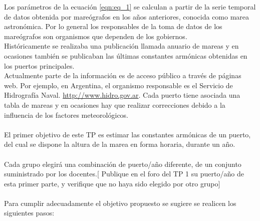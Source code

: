\documentclass[10pt,a4paper]{article}
\numberwithin{equation}{section}
\numberwithin{figure}{section}
\numberwithin{table}{section}
\begin{document}
Los parámetros de la ecuación \ref*{eqn:eq_1} se calculan a partir de la serie temporal de datos obtenida por mareógrafos en los años anteriores, conocida como marea astronómica. Por lo general los responsables de la toma de datos de los mareógrafos son organismos que dependen de los gobiernos.\\
Históricamente se realizaba una publicación llamada anuario de mareas y en ocasiones también se publicaban las últimas constantes armónicas obtenidas en los puertos principales.\\
Actualmente parte de la información es de acceso público a través de páginas web. Por ejemplo, en Argentina, el organismo responsable es el Servicio de Hidrografía Naval. \url{http://www.hidro.gov.ar}. Cada puerto tiene asociada una tabla de mareas y en ocasiones hay que realizar correcciones debido a la influencia de los factores meteorológicos.\\
\\
El primer objetivo de este TP es estimar las constantes armónicas de un puerto, del cual se dispone la altura de la marea en forma horaria, durante un año.\\
\\
Cada grupo elegirá una combinación de puerto/año diferente, de un conjunto suministrado por los docentes.[ Publique en el foro del TP 1 su puerto/año de esta primer parte, y verifique que no haya sido elegido por otro grupo]\\
\\
Para cumplir adecuadamente el objetivo propuesto se sugiere se realicen los siguientes pasos:
\end{document}
